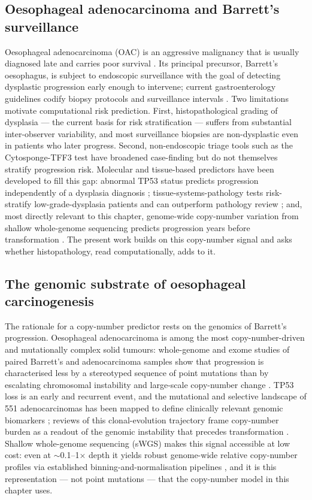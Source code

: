 \subsection{Oesophageal adenocarcinoma and Barrett's surveillance}
Oesophageal adenocarcinoma (OAC) is an aggressive malignancy that is usually
diagnosed late and carries poor survival \cite{lagergren2017oac}. Its principal
precursor, Barrett's oesophagus, is subject to endoscopic surveillance with the
goal of detecting dysplastic progression early enough to intervene; current
gastroenterology guidelines codify biopsy protocols and surveillance intervals
\cite{shaheen2022acg,weusten2023esge}. Two limitations motivate computational
risk prediction. First, histopathological grading of dysplasia --- the current
basis for risk stratification --- suffers from substantial inter-observer
variability, and most surveillance biopsies are non-dysplastic even in patients
who later progress. Second, non-endoscopic triage tools such as the
Cytosponge-TFF3 test have broadened case-finding \cite{fitzgerald2020cytosponge}
but do not themselves stratify progression risk. Molecular and tissue-based
predictors have been developed to fill this gap: abnormal TP53 status predicts
progression independently of a dysplasia diagnosis \cite{redston2022tp53};
tissue-systems-pathology tests risk-stratify low-grade-dysplasia patients and
can outperform pathology review \cite{frei2020tissuecypher,khoshiwal2023tissuecypher};
and, most directly relevant to this chapter, genome-wide copy-number variation
from shallow whole-genome sequencing predicts progression years before
transformation \cite{killcoyne2020}. The present work builds on this
copy-number signal and asks whether histopathology, read computationally, adds
to it.

\subsection{The genomic substrate of oesophageal carcinogenesis}
The rationale for a copy-number predictor rests on the genomics of Barrett's
progression. Oesophageal adenocarcinoma is among the most copy-number-driven and
mutationally complex solid tumours: whole-genome and exome studies of paired
Barrett's and adenocarcinoma samples show that progression is characterised less
by a stereotyped sequence of point mutations than by escalating chromosomal
instability and large-scale copy-number change \cite{stachler2015,weaver2014}.
TP53 loss is an early and recurrent event, and the mutational and selective
landscape of 551 adenocarcinomas has been mapped to define clinically relevant
genomic biomarkers \cite{frankell2019}; reviews of this clonal-evolution
trajectory frame copy-number burden as a readout of the genomic instability that
precedes transformation \cite{gregson2016}. Shallow whole-genome sequencing
(sWGS) makes this signal accessible at low cost: even at $\sim$0.1--1$\times$
depth it yields robust genome-wide relative copy-number profiles via
established binning-and-normalisation pipelines \cite{scheinin2014qdnaseq}, and
it is this representation --- not point mutations --- that the copy-number model
in this chapter uses.

